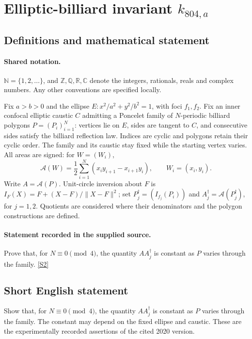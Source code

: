 \documentclass[11pt]{article}
\newcommand{\sref}[2]{\hyperlink{source:#1:#2}{[S#2]}}
\begin{document}
\section{Elliptic-billiard invariant $k_{804,a}$}\label{statement}

\subsection{Definitions and mathematical statement}

\paragraph{Shared notation.}$\mathbb N=\{1,2,\ldots\}$, and $\mathbb Z,\mathbb Q,\mathbb R,\mathbb C$ denote the integers, rationals, reals and complex numbers. Any other conventions are specified locally.


Fix $a>b>0$ and the ellipse $E:x^2/a^2+y^2/b^2=1$, with foci $f_1,f_2$. Fix an inner confocal elliptic caustic $C$ admitting a Poncelet family of $N$-periodic billiard polygons $P=(P_i)_{i=1}^N$: vertices lie on $E$, sides are tangent to $C$, and consecutive sides satisfy the billiard reflection law. Indices are cyclic and polygons retain their cyclic order. The family and its caustic stay fixed while the starting vertex varies. All areas are signed: for $W=(W_i)$,
\[\mathcal A(W)=\frac12\sum_{i=1}^N(x_i y_{i+1}-x_{i+1}y_i),\qquad W_i=(x_i,y_i).\]
Write $A=\mathcal A(P)$. Unit-circle inversion about $F$ is $I_F(X)=F+(X-F)/\lVert X-F\rVert^2$; set $P_j^\dagger=(I_{f_j}(P_i))$ and $A_j^\dagger=\mathcal A(P_j^\dagger)$, for $j=1,2$. Quotients are considered where their denominators and the polygon constructions are defined.
\paragraph{Statement recorded in the supplied source.}
Prove that, for $N\equiv0\pmod4$, the quantity $AA_j^\dagger$ is constant as $P$ varies through the family. \sref{statement}{2}
\subsection{Short English statement}
Show that, for $N\equiv0\pmod4$, the quantity $AA_j^\dagger$ is constant as $P$ varies through the family. The constant may depend on the fixed ellipse and caustic. These are the experimentally recorded assertions of the cited 2020 version.
\end{document}
